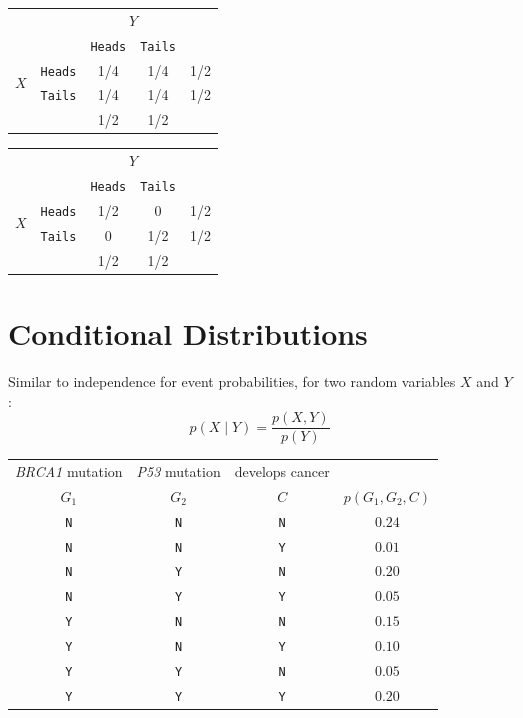 \begin{center}
\begin{tabular}{cr||c|c|c}
	&& \multicolumn{2}{c|}{$Y$}\\
	&& \texttt{Heads} & \texttt{Tails}\\
\hline\hline
\multirow{2}{*}{$X$} & \texttt{Heads}	& 1/4		& 1/4		& 1/2\\
\cline{3-4}
			& \texttt{Tails}	&	1/4	& 1/4		& 1/2\\
\hline
			&			&	1/2	& 1/2\\
\end{tabular}\hspace{3em}
%
\begin{tabular}{cr||c|c|c}
	&& \multicolumn{2}{c|}{$Y$}\\
	&& \texttt{Heads} & \texttt{Tails}\\
\hline\hline
\multirow{2}{*}{$X$} & \texttt{Heads}	& 1/2		& 0		& 1/2\\
\cline{3-4}
			& \texttt{Tails}	&	0	& 1/2		& 1/2\\
\hline
			&			&	1/2	& 1/2\\
\end{tabular}
\end{center}



\section{Conditional Distributions}
Similar to independence for event probabilities, for two random variables $X$ and $Y$ :
\[p(X\mid Y) = \frac{p(X,Y)}{p(Y)}\]

\begin{center}
\begin{tabular}{c|c|c|c}
\textit{BRCA1} mutation & \textit{P53} mutation & develops cancer & \\
$G_1$ & $G_2$ & $C$& $p(G_1,G_2,C)$\\
\hline\hline
\texttt{N}& \texttt{N}& \texttt{N}& $0.24$\\
\texttt{N}& \texttt{N}& \texttt{Y}& $0.01$\\
\texttt{N}& \texttt{Y}& \texttt{N}& $0.20$\\
\texttt{N}& \texttt{Y}& \texttt{Y}& $0.05$\\
\texttt{Y}& \texttt{N}& \texttt{N}& $0.15$\\
\texttt{Y}& \texttt{N}& \texttt{Y}& $0.10$\\
\texttt{Y}& \texttt{Y}& \texttt{N}& $0.05$\\
\texttt{Y}& \texttt{Y}& \texttt{Y}& $0.20$\\
\end{tabular}
\end{center}

